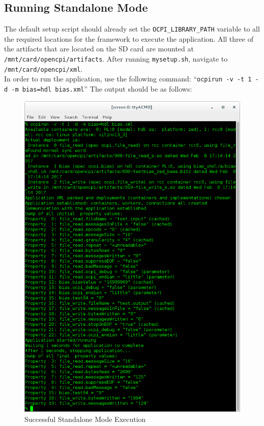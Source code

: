 \subsection{Running Standalone Mode}
\begin{flushleft}
The default setup script should already set the \texttt{OCPI\_LIBRARY\_PATH} variable to all the required locations for the framework to execute the application.  All three of the artifacts that are located on the SD card are mounted at \texttt{/mnt/card/opencpi/artifacts}.  After running \texttt{mysetup.sh}, navigate to \texttt{/mnt/card/opencpi/xml}.\\
	In order to run the application, use the following command: ``\texttt{ocpirun -v -t 1 -d -m bias=hdl bias.xml}'' The output should be as follows:
\end{flushleft}
\begin{figure}[H]
	\centerline{\includegraphics[scale=0.5]{zed_bias}}
	\caption{Successful Standalone Mode Execution}
 \label{fig:standBias}
\end{figure}

